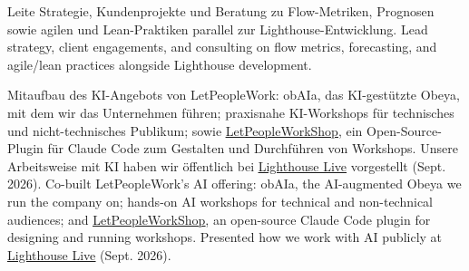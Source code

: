 \begin{cventries}
{\begin{cvitems}
{			}
			\item {
				{Leite Strategie, Kundenprojekte und Beratung zu Flow-Metriken, Prognosen sowie agilen und Lean-Praktiken parallel zur Lighthouse-Entwicklung.}
				{Lead strategy, client engagements, and consulting on flow metrics, forecasting, and agile/lean practices alongside Lighthouse development.}
			}
			\item {
				{Mitaufbau des KI-Angebots von LetPeopleWork: obAIa, das KI-gestützte Obeya, mit dem wir das Unternehmen führen; praxisnahe KI-Workshops für technisches und nicht-technisches Publikum; sowie \underline{\href{https://github.com/LetPeopleWork/LetPeopleWorkShop}{LetPeopleWorkShop}}, ein Open-Source-Plugin für Claude Code zum Gestalten und Durchführen von Workshops. Unsere Arbeitsweise mit KI haben wir öffentlich bei \underline{\href{https://www.youtube.com/watch?v=9Hu0DwLBddE}{Lighthouse Live}} vorgestellt (Sept. 2026).}
				{Co-built LetPeopleWork's AI offering: obAIa, the AI-augmented Obeya we run the company on; hands-on AI workshops for technical and non-technical audiences; and \underline{\href{https://github.com/LetPeopleWork/LetPeopleWorkShop}{LetPeopleWorkShop}}, an open-source Claude Code plugin for designing and running workshops. Presented how we work with AI publicly at \underline{\href{https://www.youtube.com/watch?v=9Hu0DwLBddE}{Lighthouse Live}} (Sept. 2026).}
			}
		\end{cvitems}
	}
\end{cventries}

\vspace{2em}


